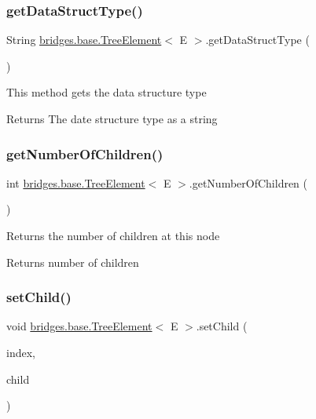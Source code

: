 \subsubsection{\texorpdfstring{get\+Data\+Struct\+Type()}{getDataStructType()}}
{\footnotesize\ttfamily String \hyperlink{classbridges_1_1base_1_1_tree_element}{bridges.\+base.\+Tree\+Element}$<$ E $>$.get\+Data\+Struct\+Type (\begin{DoxyParamCaption}{ }\end{DoxyParamCaption})}

This method gets the data structure type

\begin{DoxyReturn}{Returns}
The date structure type as a string 
\end{DoxyReturn}
\hypertarget{classbridges_1_1base_1_1_tree_element_a3722c7cec66ff297f999870df0da3cff}{}\label{classbridges_1_1base_1_1_tree_element_a3722c7cec66ff297f999870df0da3cff} 
\subsubsection{\texorpdfstring{get\+Number\+Of\+Children()}{getNumberOfChildren()}}
{\footnotesize\ttfamily int \hyperlink{classbridges_1_1base_1_1_tree_element}{bridges.\+base.\+Tree\+Element}$<$ E $>$.get\+Number\+Of\+Children (\begin{DoxyParamCaption}{ }\end{DoxyParamCaption})}

Returns the number of children at this node

\begin{DoxyReturn}{Returns}
number of children 
\end{DoxyReturn}
\hypertarget{classbridges_1_1base_1_1_tree_element_aefafebb19d64398d150e464e4361ddf0}{}\label{classbridges_1_1base_1_1_tree_element_aefafebb19d64398d150e464e4361ddf0} 
\subsubsection{\texorpdfstring{set\+Child()}{setChild()}}
{\footnotesize\ttfamily void \hyperlink{classbridges_1_1base_1_1_tree_element}{bridges.\+base.\+Tree\+Element}$<$ E $>$.set\+Child (\begin{DoxyParamCaption}\item[{int}]{index,  }\item[{\hyperlink{classbridges_1_1base_1_1_tree_element}{Tree\+Element}$<$ E $>$}]{child }\end{DoxyParamCaption})}

